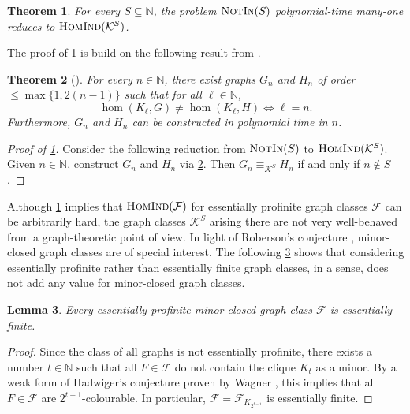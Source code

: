 \documentclass[3p,final]{elsarticle}
\newcommand{\HomInd}{\textup{\textsc{HomInd}}}
\newcommand{\Mem}{\textup{\textsc{NotIn}}}
\newtheorem{theorem}{Theorem}
\newtheorem{lemma}[theorem]{Lemma}
\begin{document}
	
	\begin{theorem} \label{thm:complexity-profinite}
		For every $S \subseteq \mathbb{N}$, the problem $\Mem(S)$ polynomial-time many-one reduces to $\HomInd(\mathcal{K}^S)$.
	\end{theorem}
	
	The proof of \cref{thm:complexity-profinite} is build on the following result from \cite{boeker_complexity_2019}.
	
	\begin{theorem}[{\cite[Corollary~14]{boeker_complexity_2019}}] \label{thm:boeker-cor14}
		For every $n \in \mathbb{N}$, 
		there exist graphs $G_n$ and $H_n$ of order $\leq \max\{1,2(n-1)\}$ such that for all $\ell \in \mathbb{N}$,
		\[
		\hom(K_\ell, G) \neq \hom(K_\ell, H) \iff \ell = n.
		\]
		Furthermore, $G_n$ and $H_n$ can be constructed in polynomial time in $n$.
	\end{theorem}
	
	\begin{proof}[Proof of \cref{thm:complexity-profinite}]
		Consider the following reduction from $\Mem(S)$ to $\HomInd(\mathcal{K}^S)$.
		Given $n \in \mathbb{N}$, construct $G_n$ and $H_n$ via \cref{thm:boeker-cor14}.
		Then $G_n \equiv_{\mathcal{K}^S} H_n$ if and only if $n \not\in S$.
	\end{proof}
	
	
	Although \cref{thm:complexity-profinite} implies that $\HomInd(\mathcal{F})$ for essentially profinite graph classes $\mathcal{F}$ can be arbitrarily hard, the graph classes $\mathcal{K}^S$ arising there are not very well-behaved from a graph-theoretic point of view.
	In light of Roberson's conjecture \cite{roberson_oddomorphisms_2022}, minor-closed graph classes are of special interest.
	The following \cref{lem:profinite-minor} shows that considering essentially profinite rather than essentially finite graph classes, in a sense, does not add any value for minor-closed graph classes.
	
	
	\begin{lemma} \label{lem:profinite-minor}
		Every essentially profinite minor-closed graph class $\mathcal{F}$ is essentially finite.
	\end{lemma}
	\begin{proof}%
		Since the class of all graphs is not essentially profinite, there exists a number $t \in \mathbb{N}$ such that all $F \in \mathcal{F}$ do not contain the clique $K_t$ as a minor.
		By a weak form of Hadwiger's conjecture \cite{seymour_hadwigers_2016} proven by Wagner \cite{wagner_beweis_1964}, this implies that all $F \in \mathcal{F}$ are $2^{t-1}$-colourable.
		In particular, $\mathcal{F} = \mathcal{F}_{K_{2^{t-1}}}$ is essentially finite.
	\end{proof}
\end{document}
